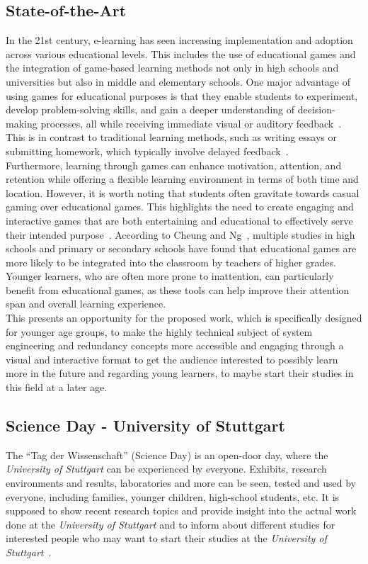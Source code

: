\subsection{State-of-the-Art}\label{subsec:state-of-the-art}
In the 21st century, e-learning has seen increasing implementation and adoption across various educational levels.
This includes the use of educational games and the integration of game-based learning methods not only in
high schools and universities but also in middle and elementary schools.
One major advantage of using games for educational purposes is that they enable students to experiment,
develop problem-solving skills, and gain a deeper understanding of decision-making processes,
all while receiving immediate visual or auditory feedback~\cite{application-of-education-games-to-enhance-student-learning}.
This is in contrast to traditional learning methods, such as writing essays or submitting homework,
which typically involve delayed feedback~\cite{more-than-just-fun-and-games}.
\\
Furthermore, learning through games can enhance motivation, attention, and retention while offering a flexible learning environment
in terms of both time and location.
However, it is worth noting that students often gravitate towards casual gaming over educational games.
This highlights the need to create engaging and interactive games that are both entertaining and educational to
effectively serve their intended purpose~\cite{WHITTON}.
According to Cheung and Ng~\cite{application-of-education-games-to-enhance-student-learning}, multiple studies in high schools and primary or secondary schools have found that educational
games are more likely to be integrated into the classroom by teachers of higher grades.
Younger learners, who are often more prone to inattention, can particularly benefit from
educational games, as these tools can help improve their attention span and overall learning experience.
\\
This presents an opportunity for the proposed work, which is specifically designed for younger age groups, to make the highly
technical subject of system engineering and redundancy concepts more accessible and engaging through a visual and interactive format
to get the audience interested to possibly learn more in the future and regarding young learners, to maybe start their studies
in this field at a later age.

\subsection{Science Day - University of Stuttgart}\label{subsec:science-day---university-of-stuttgart}
The ``Tag der Wissenschaft'' (Science Day) is an open-door day, where the \textit{University of Stuttgart} can be experienced by everyone.
Exhibits, research environments and results, laboratories and more can be seen, tested and used by everyone, including families, younger children,
high-school students, etc.
It is supposed to show recent research topics and provide insight into the actual work done at the \textit{University of Stuttgart} and to
inform about different studies for interested people who may want to start their studies at the \textit{University of Stuttgart}~\cite{tag-der-wissenschaft}.